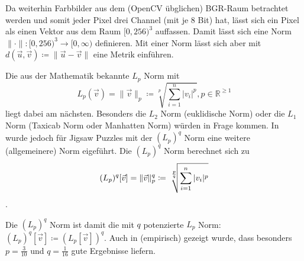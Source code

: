 \documentclass{whswinvcbook}
\begin{document}
Da weiterhin Farbbilder aus dem (OpenCV übglichen) BGR-Raum betrachtet werden und somit jeder Pixel drei Channel (mit je 8 Bit) hat, lässt sich ein Pixel als einen Vektor aus dem Raum $[0,256)^3$ auffassen. Damit lässt sich eine Norm $\|\cdot\|:[0,256)^3\rightarrow[0,\infty)$ definieren. Mit einer Norm lässt sich aber mit $d(\vec{u},\vec{v})\coloneqq\|\vec{u}-\vec{v}\|$ eine Metrik einführen.

Die aus der Mathematik bekannte $L_p$ Norm mit $$L_p(\vec{v})=\|\vec{v}\|_p\coloneqq\sqrt[p]{\sum_{i=1}^{n}|v_i|^p},p\in\mathbb{R}^{\geq1}$$ liegt dabei am nächsten. Besonders die $L_2$ Norm (euklidische Norm) oder die $L_1$ Norm (Taxicab Norm oder Manhatten Norm) würden in Frage kommen. In \cite{pomeranz} wurde jedoch für Jigsaw Puzzles mit der $(L_p)^q$ Norm eine weitere (allgemeinere) Norm eigeführt. Die $(L_p)^q$ Norm berechnet sich zu $$(L_p)^q[\vec{v}]=\|\vec{v}\|_p^q\coloneqq \sqrt[\leftroot{-2}\uproot{5}\frac{p}{q}]{\sum_{i=1}^{n}|v_i|^p}$$.

Die $(L_p)^q$ Norm ist damit die mit $q$ potenzierte $L_p$ Norm: $(L_p)^q[\vec{v}]\coloneqq(L_p[\vec{v}])^q$. Auch in \cite{pomeranz} (empirisch) gezeigt wurde, dass besonders $p=\frac{3}{10}$ und $q=\frac{1}{16}$ gute Ergebnisse liefern.
\end{document}
